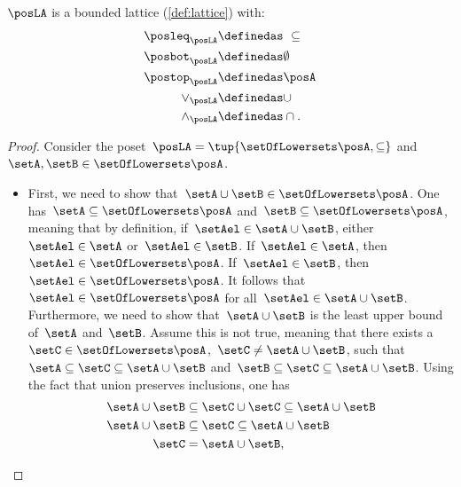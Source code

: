 \begin{lemma}
    $\posLA$ is a bounded lattice (\cref{def:lattice}) with:
    \begin{equation}
        \begin{aligned}
            \posleq_{\posLA} & \definedas \ \subseteq \\
            \posbot_{\posLA} & \definedas \emptyset   \\
            \postop_{\posLA} & \definedas \posA       \\
            \vee_{\posLA}    & \definedas \cup        \\
            \wedge_{\posLA}  & \definedas \cap.
        \end{aligned}
    \end{equation}
\end{lemma}
\begin{proof}
    Consider the poset~$\posLA=\tup{\setOfLowersets \posA,\subseteq}$ and~$\setA,\setB\in \setOfLowersets \posA$.
    \begin{itemize}
        \item First, we need to show that~$\setA\cup \setB\in \setOfLowersets \posA$.
              One has~$\setA \subseteq \setOfLowersets \posA$ and~$\setB\subseteq \setOfLowersets \posA$, meaning that by definition, if~$\setAel\in \setA\cup \setB$, either~$\setAel\in \setA$ or~$\setAel\in \setB$.
              If~$\setAel\in \setA$, then~$\setAel\in \setOfLowersets \posA$.
              If~$\setAel\in \setB$, then~$\setAel\in \setOfLowersets \posA$.
              It follows that~$\setAel\in \setOfLowersets \posA$ for all~$\setAel\in \setA\cup \setB$.
              Furthermore, we need to show that~$\setA\cup \setB$ is the least upper bound of~$\setA$ and~$\setB$.
              Assume this is not true, meaning that there exists a~$\setC\in \setOfLowersets \posA$,~$\setC\neq \setA\cup \setB$, such that~$\setA\subseteq \setC\subseteq \setA\cup \setB$ and~$\setB\subseteq \setC\subseteq \setA\cup \setB$.
              Using the fact that union preserves inclusions, one has
              \begin{equation}
                  \begin{aligned}
                      \setA\cup \setB & \subseteq \setC\cup \setC \subseteq \setA\cup \setB \\
                      \setA\cup \setB & \subseteq \setC \subseteq \setA\cup \setB           \\
                      \setC           & = \setA\cup \setB,
                  \end{aligned}

\end{equation}
\end{itemize}
\end{proof}
